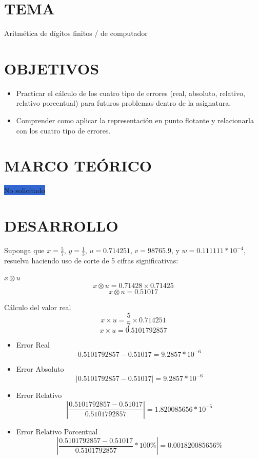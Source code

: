 \documentclass[12pt]{article}
\begin{document}
\section*{TEMA}
Aritmética de dígitos finitos / de computador

\vspace{0.5cm}

\section*{OBJETIVOS}
\begin{itemize}
    \item Practicar el cálculo de los cuatro tipo de errores (real, absoluto, relativo, relativo porcentual) para futuros problemas dentro de la asignatura.
    \item Comprender  como aplicar la representación en punto flotante y relacionarla con los cuatro tipo de errores.
\end{itemize}

\vspace{0.5cm}

\section*{MARCO TEÓRICO}
\colorbox{highlight}{No solicitado} 

\vspace{0.5cm}

\section*{DESARROLLO}
Suponga que $x = \frac{5}{7}$,  $y = \frac{1}{3}$, $u = 0.714251$, $v = 98765.9$, y $w = 0.111111*10^{-4}$, resuelva haciendo uso de corte de 5 cifras significativas:

\large\textbf{$x \otimes  u$}
\normalsize\newline
$$x \otimes  u = 0.71428 \times  0.71425$$
$$x \otimes  u = 0.51017$$

Cálculo del valor real
$$x \times   u = \frac{5}{7} \times  0.714251$$
$$x \times  u = 0.5101792857$$
\begin{itemize}
\item Error Real
$$0.5101792857 - 0.51017 = 9.2857*10^{-6}$$
\item Error Absoluto
$$
\left| 0.5101792857 - 0.51017 \right| = 9.2857*10^{-6}
$$
\item Error Relativo
$$
\left| \frac{0.5101792857 - 0.51017}{0.5101792857} \right| = 1.820085656*10^{-5}
$$
\item Error Relativo Porcentual
$$
\left| \frac{0.5101792857 - 0.51017}{0.5101792857} *100\% \right| = 0.001820085656\%
$$ 
\end{itemize}
\end{document}
